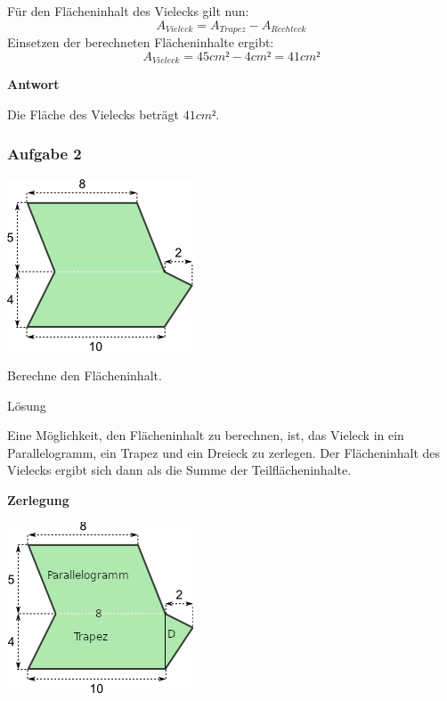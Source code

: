 \documentclass[
  ngerman,
]{book}
\begin{document}
Für den Flächeninhalt des Vielecks gilt nun:
\[A_{Vieleck} = A_{Trapez} - A_{Rechteck}\]
Einsetzen der berechneten Flächeninhalte ergibt:
\[A_{Vieleck} = 45cm² - 4cm² =  41cm²\]

\textbf{Antwort}

Die Fläche des Vielecks beträgt \(41cm²\).

\hypertarget{section-15}{%
\subsubsection*{}\label{section-15}}

\hypertarget{aufgabe-2-4}{%
\subsubsection*{Aufgabe 2}\label{aufgabe-2-4}}

\includegraphics{./Bilder/VieleckA2.png}

Berechne den Flächeninhalt.

Lösung

Eine Möglichkeit, den Flächeninhalt zu berechnen, ist, das Vieleck in ein Parallelogramm, ein Trapez und ein Dreieck zu zerlegen. Der Flächeninhalt des Vielecks ergibt sich dann als die Summe der Teilflächeninhalte.

\textbf{Zerlegung}

\includegraphics{./Bilder/VieleckL2.png}
\end{document}
